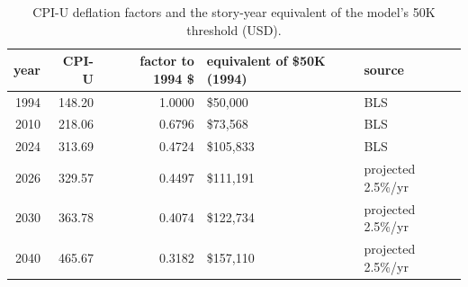 \begin{table}
\caption{CPI-U deflation factors and the story-year equivalent of the model's 50K threshold (USD).}
\label{tab:cpi}
\begin{tabular}{rrrll}
\toprule
year & CPI-U & factor to 1994 \$ & equivalent of \$50K (1994) & source \\
\midrule
1994 & 148.20 & 1.0000 & \$50,000 & BLS \\
2010 & 218.06 & 0.6796 & \$73,568 & BLS \\
2024 & 313.69 & 0.4724 & \$105,833 & BLS \\
2026 & 329.57 & 0.4497 & \$111,191 & projected 2.5\%/yr \\
2030 & 363.78 & 0.4074 & \$122,734 & projected 2.5\%/yr \\
2040 & 465.67 & 0.3182 & \$157,110 & projected 2.5\%/yr \\
\bottomrule
\end{tabular}
\end{table}

